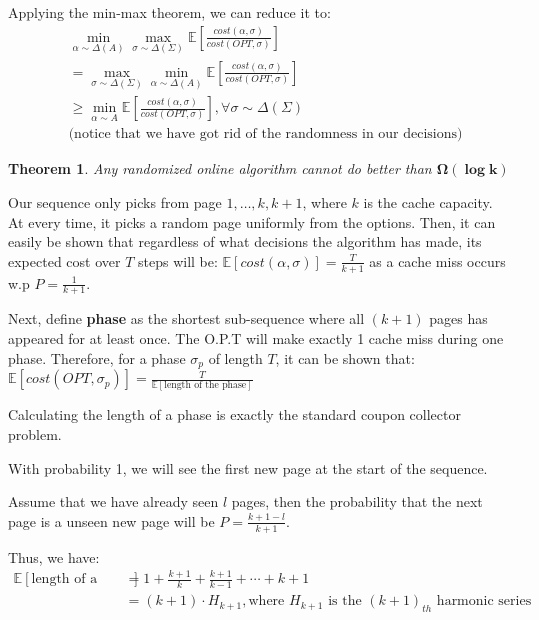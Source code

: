 \documentclass[11pt]{article}
\newtheorem{theorem}[fact]{Theorem}
\begin{document}
Applying the min-max theorem, we can reduce it to:
\begin{align*}
&\min_{\alpha \sim \Delta(A)}\max_{\sigma \sim \Delta(\Sigma)}\mathbb{E}\left[\frac{cost(\alpha, \sigma)}{cost(OPT, \sigma)}\right] \\
&=\max_{\sigma \sim \Delta(\Sigma)}\min_{\alpha \sim \Delta(A)}\mathbb{E}\left[\frac{cost(\alpha, \sigma)}{cost(OPT, \sigma)}\right] \\
&\geq \min_{\alpha \sim A} \mathbb{E}\left[\frac{cost(\alpha, \sigma)}{cost(OPT, \sigma)}\right], \forall \sigma \sim \Delta(\Sigma) \\
&\text{(notice that we have got rid of the randomness in our decisions)}
\end{align*}
\newpage
\begin{theorem}
    Any randomized online algorithm cannot do better than $\boldsymbol{\Omega(\log k)}$
\end{theorem}
Our sequence only picks from page $1, \dots, k, k+1$, where $k$ is the cache capacity. At every time, it picks a random page uniformly from the options. Then, it can easily be shown that regardless of what decisions the algorithm has made, its expected cost over $T$ steps will be: $\mathbb{E}\left[cost(\alpha, \sigma)\right] = \frac{T}{k+1}$ as a cache miss occurs w.p $P = \frac{1}{k+1}$.

Next, define \textbf{phase} as the shortest sub-sequence where all $(k+1)$ pages has appeared for at least once. The O.P.T will make exactly 1 cache miss during one phase. Therefore, for a phase $\sigma_p$ of length $T$, it can be shown that:
$\mathbb{E}\left[cost(OPT, \sigma_p)\right] = \frac{T}{\mathbb{E}\left[\text{length of the phase}\right]}$

Calculating the length of a phase is exactly the standard coupon collector problem.

With probability 1, we will see the first new page at the start of the sequence.

Assume that we have already seen $l$ pages, then the probability that the next page is a unseen new page will be $P = \frac{k+1-l}{k+1}$.

Thus, we have:
\begin{align*}
\mathbb{E}\left[\text{length of a phase}\right] &= 1 + \frac{k+1}{k} + \frac{k+1}{k-1} + \cdots  + k+1\\
&= (k+1) \cdot H_{k+1}, \text{where $H_{k+1}$ is the $(k+1)_{th}$ harmonic series}    
\end{align*}
\end{document}
